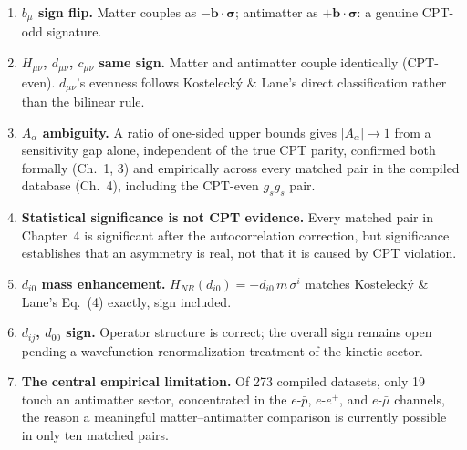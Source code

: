 \documentclass[main]{subfiles}
\begin{document}
\begin{enumerate}
  \item \textbf{$b_\mu$ sign flip.} Matter couples as $-\mathbf b\cdot\boldsymbol\sigma$; antimatter as $+\mathbf b\cdot\boldsymbol\sigma$: a genuine CPT-odd signature.
  \item \textbf{$H_{\mu\nu}$, $d_{\mu\nu}$, $c_{\mu\nu}$ same sign.} Matter and antimatter couple identically (CPT-even). $d_{\mu\nu}$'s evenness follows Kostelecký \& Lane's direct classification rather than the bilinear rule.
  \item \textbf{$A_\alpha$ ambiguity.} A ratio of one-sided upper bounds gives $|A_\alpha|\to1$ from a sensitivity gap alone, independent of the true CPT parity, confirmed both formally (Ch.~1, 3) and empirically across every matched pair in the compiled database (Ch.~4), including the CPT-even $g_sg_s$ pair.
  \item \textbf{Statistical significance is not CPT evidence.} Every matched pair in Chapter~4 is significant after the autocorrelation correction, but significance establishes that an asymmetry is real, not that it is caused by CPT violation.
  \item \textbf{$d_{i0}$ mass enhancement.} $H_{NR}(d_{i0})=+d_{i0}\,m\,\sigma^i$ matches Kostelecký \& Lane's Eq.~(4) exactly, sign included.
  \item \textbf{$d_{ij}$, $d_{00}$ sign.} Operator structure is correct; the overall sign remains open pending a wavefunction-renormalization treatment of the kinetic sector.
  \item \textbf{The central empirical limitation.} Of 273 compiled datasets, only 19 touch an antimatter sector, concentrated in the $e$-$\bar p$, $e$-$e^+$, and $e$-$\bar\mu$ channels, the reason a meaningful matter--antimatter comparison is currently possible in only ten matched pairs.
\end{enumerate}
\end{document}
